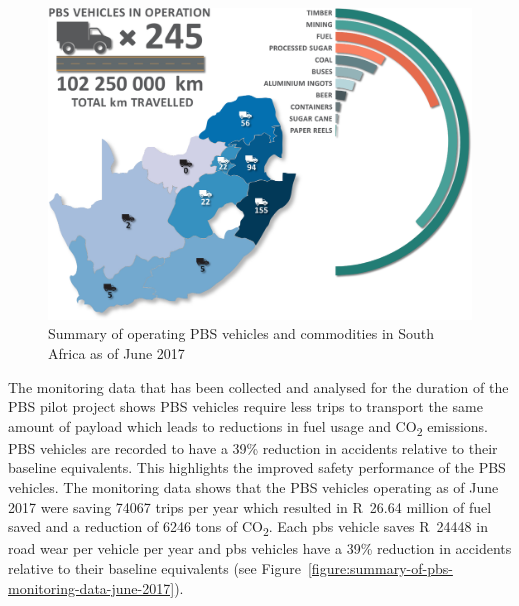     \begin{figure}[H]
        \centering
        \includegraphics[width=1\textwidth]{fig/pbs-pilot_vehicles-and-commodities-june-2017}
        \caption{Summary of operating PBS vehicles and commodities in South Africa as of June 2017 \cite{Nordengen2018}}
        \label{figure:summary-of-operating-pbs-vehicles-and-commodities-in-south-africa-june-2017}
    \end{figure}

    The monitoring data that has been collected and analysed for the duration of the PBS pilot project shows PBS vehicles require less trips to transport the same amount of payload which leads to reductions in fuel usage and CO\textsubscript{2} emissions. PBS vehicles are recorded to have a 39\% reduction in accidents relative to their baseline equivalents. This highlights the improved safety performance of the PBS vehicles. The monitoring data shows that the PBS vehicles operating as of June 2017 were saving 74067 trips per year which resulted in R~26.64 million of fuel saved and a reduction of 6246 tons of CO\textsubscript{2}. Each \gls{pbs} vehicle saves R~24448 in road wear per vehicle per year and \gls{pbs} vehicles have a 39\% reduction in accidents relative to their baseline equivalents (see Figure~\ref{figure:summary-of-pbs-monitoring-data-june-2017}).

